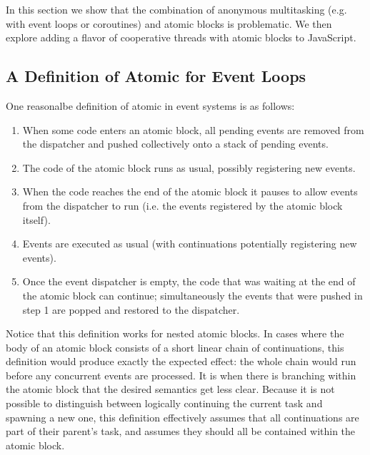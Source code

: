 \documentclass[acmsmall,anonymous,review]{acmart}\settopmatter{printfolios=true,printccs=false,printacmref=false}
\begin{document}

In this section we show that the combination of anonymous multitasking (e.g. with event loops or coroutines) and atomic blocks is problematic.
We then explore adding a flavor of cooperative threads with atomic blocks to JavaScript.

\subsection{A Definition of Atomic for Event Loops} \label{sec:candidate_atomic}

One reasonalbe definition of atomic in event systems is as follows:


\begin{enumerate}
\item When some code enters an atomic block, all pending events are removed from the dispatcher and pushed collectively onto a stack of pending events.
\item The code of the atomic block runs as usual, possibly registering new events.
\item When the code reaches the end of the atomic block it pauses to allow events from the dispatcher to run (i.e. the events registered by the atomic block itself).
\item Events are executed as usual (with continuations potentially registering new events).
\item Once the event dispatcher is empty, the code that was waiting at the end of the atomic block can continue; simultaneously the events that were pushed in step 1 are popped and restored to the dispatcher.
\end{enumerate}

Notice that this definition works for nested atomic blocks.
In cases where the body of an atomic block consists of a short linear chain of continuations, this definition would produce exactly the expected effect: the whole chain would run before any concurrent events are processed.
It is when there is branching within the atomic block that the desired semantics get less clear.
Because it is not possible to distinguish between logically continuing the current task and spawning a new one, this definition effectively assumes that all continuations are part of their parent's task, and assumes they should all be contained within the atomic block.
\end{document}
